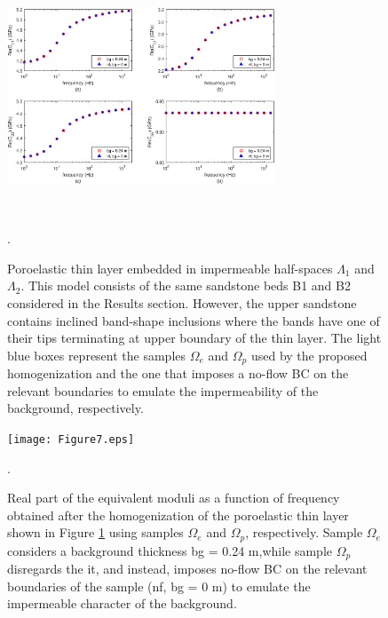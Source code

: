 \documentclass[draft]{agujournal2019}
\begin{document}
\begin{figure}[!ht]
\centering
        \includegraphics[width= 80mm, height=70mm]{Figure6.eps}
\caption{Poroelastic thin layer embedded in impermeable half-spaces $\Lambda_1$ and $\Lambda_2$. This model consists of the same sandstone beds B1 and B2 considered in the Results section. However, the upper sandstone contains inclined band-shape inclusions where the bands have one of their tips terminating at upper boundary of the thin layer. The light blue boxes represent the samples $\Omega_e$ and $\Omega_p$ used by the proposed homogenization and the one that imposes a no-flow BC on the relevant boundaries to emulate the impermeability of the background, respectively.}. 
\label{fig.6}
\end{figure}

\begin{figure}[!ht]
\centering
        \texttt{[image: Figure7.eps]}
\caption{Real part of the equivalent moduli as a function of frequency obtained after the homogenization of the poroelastic thin layer shown in Figure \ref{fig.6} using samples $\Omega_e$ and  $\Omega_p$, respectively. Sample $\Omega_e$ considers a background thickness bg = 0.24 m,while sample $\Omega_p$ disregards the it, and instead, imposes no-flow BC on the relevant boundaries of the sample (nf, bg = 0 m) to emulate the impermeable character of the background.}. 
\label{fig.7}
\end{figure}
\end{document}
